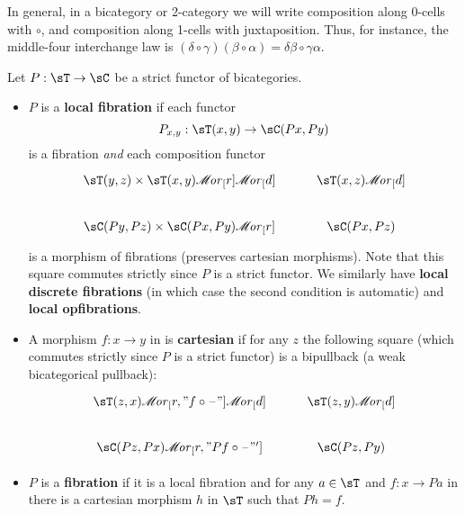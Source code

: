 \documentclass{amsart}
\def\ar#1{\mathscr{M}\!\mathit{or}_{#1}}
\begin{document}
In general, in a bicategory or 2-category we will write composition along 0-cells with $\circ$, and composition along 1-cells with juxtaposition.
Thus, for instance, the middle-four interchange law is $(\delta\circ\gamma)(\beta\circ \alpha) = \delta\beta\circ \gamma\alpha$.

\begin{defn}
  Let $P:\sT\to\sC$ be a strict functor of bicategories.
  \begin{itemize}
  \item $P$ is a \textbf{local fibration} if each functor
    \[ P_{x,y}:\sT(x,y) \to \sC(Px,Py) \]
    is a fibration \emph{and} each composition functor
    \[
    \begin{tikzcd}
      \sT(y,z) \times \sT(x,y) \ar[r] \ar[d] & \sT(x,z) \ar[d] \\
      \sC(Py,Pz) \times \sC(Px,Py) \ar[r] & \sC(Px,Pz)
    \end{tikzcd}
    \]
    is a morphism of fibrations (preserves cartesian morphisms).
    Note that this square commutes strictly since $P$ is a strict functor.
    We similarly have \textbf{local discrete fibrations} (in which case the second condition is automatic) and \textbf{local opfibrations}.
  \item A morphism $f:x\to y$ in \sC is \textbf{cartesian} if for any $z$ the following square (which commutes strictly since $P$ is a strict functor) is a bipullback (a weak bicategorical pullback):
    \[
    \begin{tikzcd}
      \sT(z,x) \ar[r,"f\circ\blank"]\ar[d] & \sT(z,y) \ar[d]\\
      \sC(Pz,Px) \ar[r,"Pf\circ \blank"'] & \sC(Pz,Py)
    \end{tikzcd}
    \]
  \item $P$ is a \textbf{fibration} if it is a local fibration and for any $a\in\sT$ and $f:x\to Pa$ in \sC there is a cartesian morphism $h$ in $\sT$ such that $Ph=f$.

\end{itemize}
\end{defn}
\end{document}
